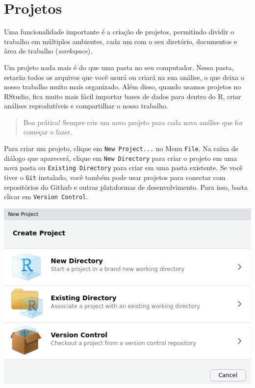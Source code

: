 \documentclass[
]{book}
\begin{document}
\hypertarget{projetos}{%
\section{Projetos}\label{projetos}}

Uma funcionalidade importante é a criação de projetos, permitindo dividir o trabalho em múltiplos ambientes, cada um com o seu diretório, documentos e área de trabalho (\emph{workspace}).

Um projeto nada mais é do que uma pasta no seu computador. Nessa pasta, estarão todos os arquivos que você usurá ou criará na sua análise, o que deixa o nosso trabalho muito mais organizado. Além disso, quando usamos projetos no RStudio, fica muito mais fácil importar bases de dados para dentro do R, criar análises reprodutíveis e compartilhar o nosso trabalho.

\begin{quote}
Boa prática! Sempre crie um novo projeto para cada nova análise que for começar a fazer.
\end{quote}

Para criar um projeto, clique em \texttt{New\ Project...} no Menu \texttt{File}. Na caixa de diálogo que aparecerá, clique em \texttt{New\ Directory} para criar o projeto em uma nova pasta ou \texttt{Existing\ Directory} para criar em uma pasta existente. Se você tiver o \texttt{Git} instalado, você também pode usar projetos para conectar com repositórios do Github e outras plataformas de desenvolvimento. Para isso, basta clicar em \texttt{Version\ Control}.

\begin{center}\includegraphics[width=7.4in]{img/rstudio/projetos} \end{center}
\end{document}
